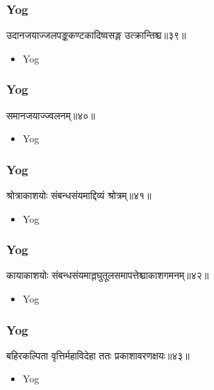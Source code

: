 \begin{frame}[fragile]\frametitle{Yog}
\begin{sanskrit}
उदानजयाज्जलपङ्ककण्टकादिष्वसङ्ग उत्क्रान्तिश्च॥३९॥
\end{sanskrit}
	\begin{itemize}
	\item Yog 
	\end{itemize}
\end{frame}

\begin{frame}[fragile]\frametitle{Yog}
\begin{sanskrit}
समानजयाज्ज्वलनम्॥४०॥
\end{sanskrit}
	\begin{itemize}
	\item Yog 
	\end{itemize}
\end{frame}

\begin{frame}[fragile]\frametitle{Yog}
\begin{sanskrit}
श्रोत्राकाशयोः संबन्धसंयमाद्दिव्यं श्रोत्रम्॥४१॥
\end{sanskrit}
	\begin{itemize}
	\item Yog 
	\end{itemize}
\end{frame}


\begin{frame}[fragile]\frametitle{Yog}
\begin{sanskrit}
कायाकाशयोः संबन्धसंयमाल्लघुतूलसमापत्तेश्चाकाशगमनम्॥४२॥
\end{sanskrit}
	\begin{itemize}
	\item Yog 
	\end{itemize}
\end{frame}

\begin{frame}[fragile]\frametitle{Yog}
\begin{sanskrit}
बहिरकल्पिता वृत्तिर्महाविदेहा ततः प्रकाशावरणक्षयः॥४३॥
\end{sanskrit}
	\begin{itemize}
	\item Yog 
	\end{itemize}
\end{frame}

